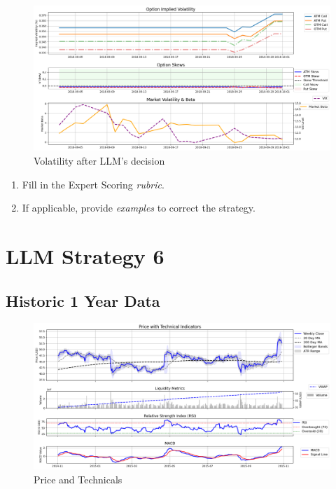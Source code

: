 \documentclass[8pt]{scrartcl}
\begin{document}
\begin{figure}[H]
    \centering
    \includegraphics[width=1\linewidth]{judge_reviews/AMZN_M_gpt-4o-mini/2018-09-01/llm_Market_Volatility_&_Beta.png}
    \caption{Volatility after LLM's decision}
\end{figure}

\begin{tcolorbox}[colback=blue!10, colframe=blue!60, title=\textbf{TASKS}, sharp corners=southwest]
\begin{enumerate}
    \item Fill in the Expert Scoring \textit{rubric}.
    \item If applicable, provide \textit{examples} to correct the strategy.
\end{enumerate}
\end{tcolorbox}

\newpage


\section*{LLM Strategy 6}
\label{app:s6}

\subsection*{Historic 1 Year Data}

\begin{figure}[H]
    \centering
    \includegraphics[width=1\linewidth]{judge_reviews/MSFT_M_gpt-4o-mini/2015-11-01/judge_Price_with_Technical_Indicators.png}
    \caption{Price and Technicals}
\end{figure}
\end{document}
